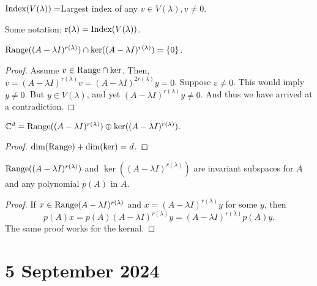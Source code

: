 \documentclass{article}
\begin{document}
\begin{definition}{}
    $\text{Index}(V(\lambda)) = $Largest index of any $v \in V(\lambda), v\neq 0$. 
\end{definition}

Some notation: $\text{r}(\lambda) = \text{Index}(V(\lambda))$. 


\begin{theorem}[Claim.]{}
    $\text{Range}((A - \lambda I)^{r(\lambda)}) \cap \ker((A - \lambda I)^{r(\lambda)}) = \{0\}$.
\end{theorem}
\begin{proof}
    Assume $v \in \text{Range} \cap \ker$. Then, $v = (A - \lambda I)^{r(\lambda)}v = (A - \lambda I)^{2 r(\lambda)}y = 0$.  Suppose $v \neq 0$. This would imply $y \neq 0$. But $y \in V(\lambda)$, and yet $(A - \lambda I)^{r(\lambda)} y \neq 0$. And thus we have arrived at a contradiction. 
\end{proof}


\begin{theorem}[Claim.]{}
    $\mathbb{C}^d = \text{Range}((A - \lambda I)^{r(\lambda)}) \oplus \ker( (A - \lambda I)^{r(\lambda)}).$
\end{theorem}
\begin{proof}
    $\dim(\text{Range}) + \dim(\ker) = d$.
\end{proof}

\begin{theorem}[Claim.]{}
    $\text{Range}((A - \lambda I)^{r(\lambda)})$ and $\ker((A - \lambda I)^{r(\lambda)})$ are invariant subspaces for $A$ and any polynomial $p(A)$ in $A$. 
\end{theorem}
\begin{proof}
    If $x\in \text{Range}(A - \lambda I)^{r(\lambda)}$ and $x = (A - \lambda I)^{r(\lambda)}y$ for some $y$, then 
        \[
            p(A) x = p(A) (A - \lambda I)^{r (\lambda)}y = (A - \lambda I)^{r(\lambda)}p(A) y.
        \]
    The same proof works for the kernal. 
\end{proof}


\section*{5 September 2024}
\end{document}
